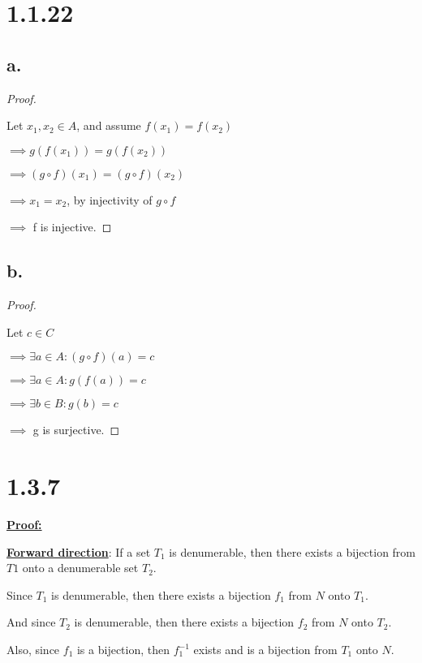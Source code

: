 \documentclass{article}
\begin{document}
\section*{1.1.22}
\subsection*{a.}

\begin{proof}
  $ $

  Let $x_1, x_2 \in A$, and assume $f(x_1) = f(x_2)$

  $\implies g(f(x_1)) = g(f(x_2))$

  $\implies (g\circ f)(x_1) = (g\circ f)(x_2)$
  
  $\implies x_1 = x_2$, by injectivity of $g \circ f$

  $\implies$ f is injective.

\end{proof}

\subsection*{b.}
\begin{proof}
  $ $

  Let $c \in C$

  $\implies \exists a \in A: (g\circ f)(a) = c$

  $\implies \exists a \in A: g(f(a)) = c$

  $\implies \exists b \in B: g(b) = c$

  $\implies$ g is surjective.  

\end{proof}


\section*{1.3.7}
\textbf{\underline{Proof:}}
\newline

\noindent
\textbf{\underline{Forward direction}}: If a set $T_1$ is denumerable, then there exists a bijection from $T1$ onto a denumerable set $T_2$. 
\newline

\noindent 
Since $T_1$ is denumerable, then there exists a bijection $f_1$ from $N$ onto $T_1$.

\noindent
And since $T_2$ is denumerable, then there exists a bijection $f_2$ from $N$ onto $T_2$.

\noindent
Also, since $f_1$ is a bijection, then $f_1^{-1}$ exists and is a bijection from $T_1$ onto $N$.
\end{document}
